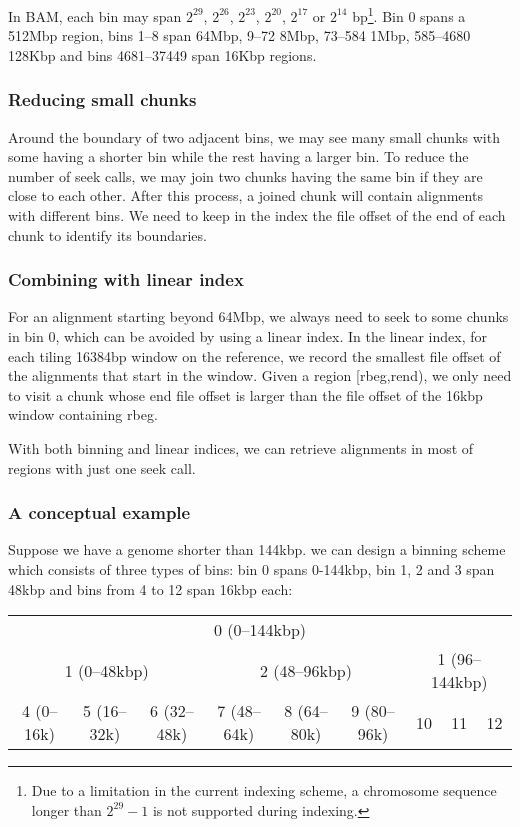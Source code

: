 \documentclass[10pt]{article}
\begin{document}
In BAM, each bin may span $2^{29}$, $2^{26}$, $2^{23}$, $2^{20}$,
$2^{17}$ or $2^{14}$ bp\footnote{Due to a limitation in the current indexing
scheme, a chromosome sequence longer than $2^{29}-1$ is not supported during
indexing.}. Bin 0 spans a 512Mbp region, bins 1--8 span 64Mbp, 9--72 8Mbp,
73--584 1Mbp, 585--4680 128Kbp and bins 4681--37449
span 16Kbp regions.

\subsubsection{Reducing small chunks}
Around the boundary of two adjacent bins, we may see many small chunks
with some having a shorter bin while the rest having a larger bin. To
reduce the number of seek calls, we may join two chunks having the same
bin if they are close to each other. After this process, a joined chunk
will contain alignments with different bins. We need to keep in the
index the file offset of the end of each chunk to identify its
boundaries.

\subsubsection{Combining with linear index}
For an alignment starting beyond 64Mbp, we always need to seek to some
chunks in bin 0, which can be avoided by using a linear index. In the
linear index, for each tiling 16384bp window on the reference, we record
the smallest file offset of the alignments that start in the
window. Given a region [rbeg,rend), we only need to visit a chunk whose
end file offset is larger than the file offset of the 16kbp window
containing rbeg.

With both binning and linear indices, we can retrieve alignments in most
of regions with just one seek call.

\subsubsection{A conceptual example}
Suppose we have a genome shorter than 144kbp. we can design a binning
scheme which consists of three types of bins: bin 0 spans 0-144kbp, bin
1, 2 and 3 span 48kbp and bins from 4 to 12 span 16kbp each:

\begin{table}[h]
  \centering
  {\small\begin{tabular}{|c|c|c|c|c|c|c|c|c|}
    \cline{1-9}
    \multicolumn{9}{|c|}{0 (0--144kbp)}\\\cline{1-9}
    \multicolumn{3}{|c|}{1 (0--48kbp)} & \multicolumn{3}{c|}{2 (48--96kbp)} & \multicolumn{3}{c|}{1 (96--144kbp)} \\\cline{1-9}
    4 (0--16k) & 5 (16--32k) & 6 (32--48k) & 7 (48--64k) & 8 (64--80k) & 9 (80--96k) & 10 & 11 & 12 \\
    \cline{1-9}
  \end{tabular}}
\end{table}
\end{document}
